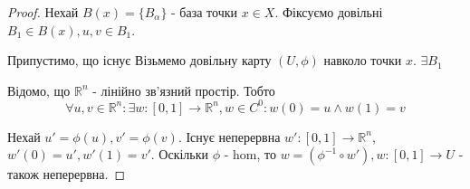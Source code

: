 \documentclass[11pt, a4paper]{article} %
\newcommand{\R}{\mathbb{R}}
\begin{document}

        


\begin{proof}
    Нехай $B(x)=\{B_\alpha\}$ - база точки $x\in X$. 
    Фіксуємо довільні $B_1\in B(x), u,v\in B_1$.

    Припустимо, що існує 
    Візьмемо довільну карту $(U, \phi)$ навколо точки $x$.
    $\exists B_1$

    Відомо, що $\R^n$ - лінійно зв'язний простір.
    Тобто
    \[\forall u,v \in \R^n : \exists w:[0,1]\to \R^n, w \in C^0: w(0)=u \land w(1)=v\] 
    
    Нехай $u' = \phi(u), v' = \phi(v)$. 
    Існує неперервна $w':[0,1]\to \R^n$, $w'(0) = u', w'(1)=v'$.
    Оскільки $\phi$ - hom, то $w = \left(\phi^{-1} \circ w'\right), w : [0,1] \to U$ - також неперервна.

\end{proof}

\end{document}
